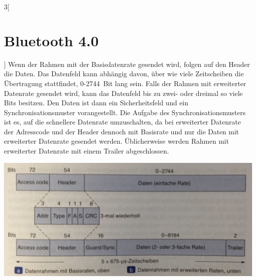 \begin{multicols}{3}[\section{Bluetooth 4.0}]
Wenn der Rahmen mit der Basisdatenrate gesendet wird, folgen auf den Header die Daten. Das Datenfeld kann abhängig davon, über wie viele Zeitscheiben die Übertragung stattfindet, 0-2744~Bit lang sein. Falls der Rahmen mit erweiterter Datenrate gesendet wird, kann das Datenfeld bis zu zwei- oder dreimal so viele Bits besitzen. Den Daten ist dann ein Sicherheitsfeld und ein Synchronisationsmuster vorangestellt. Die Aufgabe des Synchronisationsmusters ist es, auf die schnellere Datenrate umzuschalten, da bei erweiterter Datenrate der Adresscode und der Header dennoch mit Basisrate und nur die Daten mit erweiterter Datenrate gesendet werden. Üblicherweise werden Rahmen mit erweiterter Datenrate mit einem Trailer abgeschlossen. \cite{Bluetooth_4.2}

\begin{Figure}
\includegraphics[width=\linewidth]{Kapitel/Bluetooth_4/Grafiken/rahmenstruktur.jpg}
\label{fig:bt4.rahmenstruktur}
\end{Figure}

\end{multicols}
\newpage
